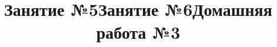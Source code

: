 \begin{listofex}
	\item {}
	\item {}
	\item {}
	\item {}
	\item {}
	\item {}
	\item {}
\end{listofex}
\newpage
\title{Занятие №5}
\begin{listofex}
	\item {}
	\item {}
	\item {}
	\item {}
	\item {}
	\item {}
	\item {}
	\item {}
\end{listofex}
\newpage
\title{Занятие №6}
\begin{listofex}
	\item {}
	\item {}
	\item {}
	\item {}
	\item {}
	\item {}
	\item {}
	\item {}
\end{listofex}
\newpage
\title{Домашняя работа №3}
\begin{listofex}
	\item {}
	\item {}
	\item {}
	\item {}
	\item {}
	\item {}
	\item {}
\end{listofex}
%
%
